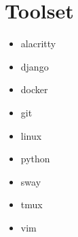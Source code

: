 \documentclass{article}
\begin{document}
\hspace*{0.5cm}
\begin{minipage}[t]{.2\textwidth}
\section*{Toolset}
\vspace{0.8em}
\begin{itemize}
    \item alacritty
    \item django
    \item docker
    \item git
    \item linux
    \item python
    \item sway
    \item tmux
    \item vim
\end{itemize}
\end{minipage}
\end{document}
